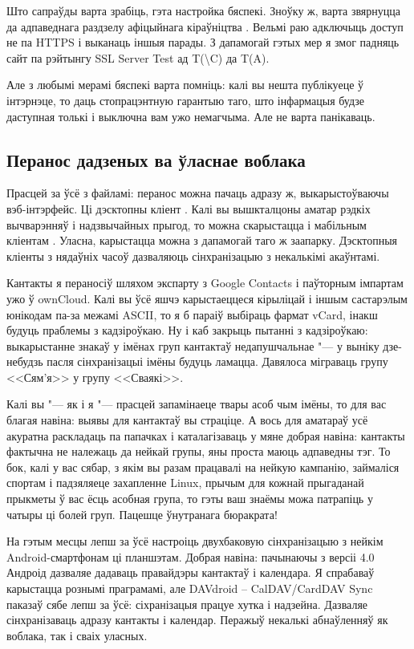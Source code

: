 \documentclass[10pt, a5paper]{article}
\begin{document}
Што сапраўды варта зрабіць, гэта настройка бяспекі. Зноўку ж, варта звярнуцца да адпаведнага раздзелу афіцыйнага кіраўніцтва \cite{zahar3}. Вельмі раю адключыць доступ не па HTTPS і выканаць іншыя парады. З дапамогай гэтых мер я змог падняць сайт па рэйтынгу SSL Server Test \cite{zahar5} ад T(\textbackslash{}C) да T(A).

Але з любымі мерамі бяспекі варта помніць: калі вы нешта публікуеце ў інтэрнэце, то даць стопрацэнтную гарантыю таго, што інфармацыя будзе даступная толькі і выключна вам ужо немагчыма. Але не варта панікаваць.

\subsection*{Перанос дадзеных ва ўласнае воблака}

Прасцей за ўсё з файламі: перанос можна пачаць адразу ж, выкарыстоўваючы вэб-інтэрфейс. Ці дэсктопны кліент \cite{zahar7}. Калі вы вышкталцоны аматар рэдкіх вычварэнняў і надзвычайных прыгод, то можна скарыстацца і мабільным кліентам \cite{zahar8}. Уласна, карыстацца можна з дапамогай таго ж заапарку. Дэсктопныя кліенты з нядаўніх часоў дазваляюць сінхранізацыю з некалькімі акаўнтамі.

Кантакты я пераносіў шляхом экспарту з Google Contacts і паўторным імпартам ужо ў ownCloud. Калі вы ўсё яшчэ карыстаеццеся кірыліцай і іншым састарэлым юнікодам па-за межамі ASCII, то я б параіў выбіраць фармат vCard, інакш будуць праблемы з кадзіроўкаю. Ну і каб закрыць пытанні з кадзіроўкаю: выкарыстанне знакаў у імёнах груп кантактаў недапушчальнае "--- у выніку дзе-небудзь пасля сінхранізацыі імёны будуць ламацца. Давялоса міграваць групу <<Сям'я>> у групу <<Сваякі>>.

Калі вы "--- як і я "--- прасцей запамінаеце твары асоб чым імёны, то для вас благая навіна: выявы для кантактаў вы страціце. А вось для аматараў усё акуратна раскладаць па папачках і каталагізаваць у мяне добрая навіна: кантакты фактычна не належаць да нейкай групы, яны проста маюць адпаведны тэг. То бок, калі у вас сябар, з якім вы разам працавалі на нейкую кампанію, займаліся спортам і падзяляеце захапленне Linux, прычым для кожнай прыгаданай прыкметы ў вас ёсць асобная група, то гэты ваш знаёмы можа патрапіць у чатыры ці болей груп. Пацешце ўнутранага бюракрата!

На гэтым месцы лепш за ўсё настроіць двухбаковую сінхранізацыю з нейкім Android-смартфонам ці планшэтам. Добрая навіна: пачынаючы з версіі 4.0 Андроід дазваляе дадаваць правайдэры кантактаў і календара. Я спрабаваў карыстацца рознымі праграмамі, але DAVdroid – CalDAV/CardDAV Sync паказаў сябе лепш за ўсё: сіхранізацыя працуе хутка і надзейна. Дазваляе сінхранізаваць адразу кантакты і календар. Перажыў некалькі абнаўленняў як воблака, так і сваіх уласных.
\end{document}
